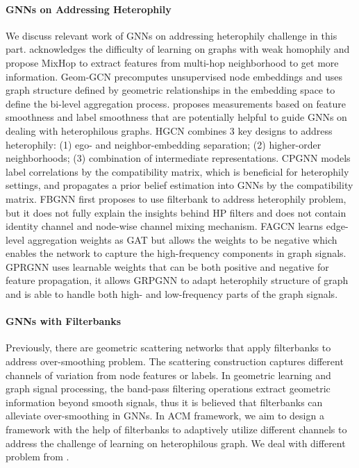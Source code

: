 \documentclass{article}
\newcommand{\0}{{\boldsymbol{0}}}
\newcommand{\6}{{\partial}}
\newcommand{\8}{{\infty}}
\newcommand{\4}{{\nabla}}
\begin{document}
\paragraph{GNNs on Addressing Heterophily}
We discuss relevant work of GNNs on addressing heterophily challenge in this part. \cite{abu2019mixhop} acknowledges the difficulty of learning on graphs with weak homophily and propose MixHop to extract features from multi-hop neighborhood to get more information. Geom-GCN \cite{pei2020geom} precomputes unsupervised node embeddings and uses graph structure defined by geometric relationships in the embedding space to define the bi-level aggregation process. \cite{hou2019measuring} proposes measurements based on feature smoothness and label smoothness that are potentially helpful to guide GNNs on dealing with heterophilous graphs. HGCN \cite{zhu2020beyond} combines 3 key designs to address heterophily: (1) ego- and neighbor-embedding separation; (2) higher-order neighborhoods; (3) combination of intermediate representations. CPGNN \cite{zhu2020graph} models label correlations by the compatibility matrix, which is beneficial for heterophily settings, and propagates a prior belief estimation into GNNs by the compatibility matrix. FBGNN \cite{luan2020complete} first proposes to use filterbank to address heterophily problem, but it does not fully explain the insights behind HP filters and does not contain identity channel and node-wise channel mixing mechanism. FAGCN \cite{bo2021beyond} learns edge-level aggregation weights as GAT \cite{velivckovic2017attention} but allows the weights to be negative which enables the network to capture the high-frequency components in graph signals. GPRGNN \cite{chien2021adaptive} uses learnable weights that can be both positive and negative for feature propagation, it allows GRPGNN to adapt heterophily structure of graph and is able to handle both high- and low-frequency parts of the graph signals.
\vspace*{-2.5mm}
\paragraph{GNNs with Filterbanks}
Previously, there are geometric scattering networks \cite{gao2019geometric, min2020scattering} that apply filterbanks to address over-smoothing \cite{li2018deeper} problem. The scattering construction captures different channels of variation from node features or labels. In geometric learning and graph signal processing, the band-pass filtering operations extract geometric information beyond smooth signals, thus it is believed that filterbanks can alleviate over-smoothing in GNNs. In ACM framework, we aim to design a framework with the help of filterbanks to adaptively utilize different channels to address the challenge of learning on heterophilous graph. We deal with different problem from \cite{gao2019geometric, min2020scattering}. 
\vspace*{-2.5mm}
\end{document}
